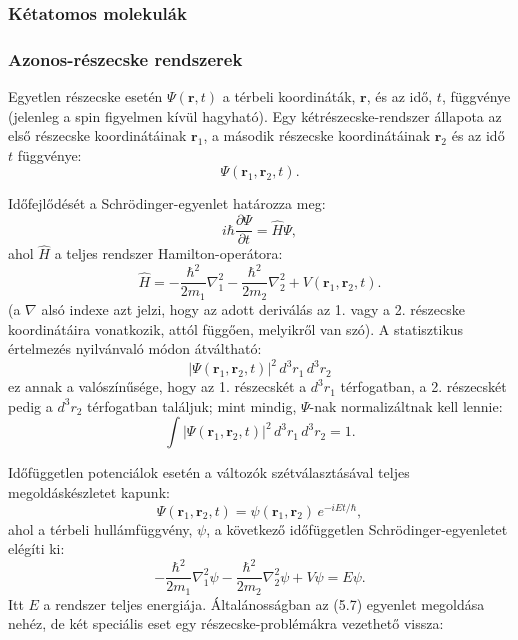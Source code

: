 \documentclass[../main.tex]{subfiles}
\begin{document}
\subsubsection{Kétatomos molekulák}
\subsubsection*{Azonos-részecske rendszerek}
Egyetlen részecske esetén $\Psi(\mathbf{r},t)$ a térbeli koordináták, $\mathbf{r}$, és az idő, $t$, függvénye (jelenleg a spin figyelmen kívül hagyható). Egy kétrészecske-rendszer állapota az első részecske koordinátáinak $\mathbf{r}_1$, a második részecske koordinátáinak $\mathbf{r}_2$ és az idő $t$ függvénye:
\begin{equation}
\Psi(\mathbf{r}_1,\mathbf{r}_2,t).
\tag{5.1}
\end{equation}

Időfejlődését a Schrödinger-egyenlet határozza meg:
\begin{equation}
i\hbar\frac{\partial \Psi}{\partial t} = \hat{H}\Psi,
\tag{5.2}
\end{equation}
ahol $\hat{H}$ a teljes rendszer Hamilton-operátora:
\begin{equation}
\hat{H} = -\frac{\hbar^2}{2m_1}\nabla_1^2 - \frac{\hbar^2}{2m_2}\nabla_2^2 + V(\mathbf{r}_1,\mathbf{r}_2,t).
\tag{5.3}
\end{equation}
(a $\nabla$ alsó indexe azt jelzi, hogy az adott deriválás az 1. vagy a 2. részecske koordinátáira vonatkozik, attól függően, melyikről van szó). A statisztikus értelmezés nyilvánvaló módon átváltható:
\begin{equation}
|\Psi(\mathbf{r}_1,\mathbf{r}_2,t)|^2\, d^3r_1\, d^3r_2
\tag{5.4}
\end{equation}
ez annak a valószínűsége, hogy az 1. részecskét a $d^3r_1$ térfogatban, a 2. részecskét pedig a $d^3r_2$ térfogatban találjuk; mint mindig, $\Psi$-nak normalizáltnak kell lennie:
\begin{equation}
\int |\Psi(\mathbf{r}_1,\mathbf{r}_2,t)|^2\, d^3r_1\, d^3r_2 = 1.
\tag{5.5}
\end{equation}

Időfüggetlen potenciálok esetén a változók szétválasztásával teljes megoldáskészletet kapunk:
\begin{equation}
\Psi(\mathbf{r}_1,\mathbf{r}_2,t) = \psi(\mathbf{r}_1,\mathbf{r}_2)\, e^{-iEt/\hbar},
\tag{5.6}
\end{equation}
ahol a térbeli hullámfüggvény, $\psi$, a következő időfüggetlen Schrödinger-egyenletet elégíti ki:
\begin{equation}
-\frac{\hbar^2}{2m_1}\nabla_1^2\psi - \frac{\hbar^2}{2m_2}\nabla_2^2\psi + V\psi = E\psi.
\tag{5.7}
\end{equation}
Itt $E$ a rendszer teljes energiája. Általánosságban az (5.7) egyenlet megoldása nehéz, de két speciális eset egy részecske-problémákra vezethető vissza:
\end{document}
